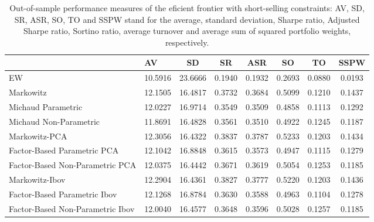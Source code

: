 \begin{table}

\caption{\label{tab:empirical_ef_2}Out-of-sample performance measures of the eficient frontier with short-selling constraints: AV, SD, SR, ASR, SO, TO and SSPW stand for the average, standard deviation, Sharpe ratio, Adjusted Sharpe ratio, Sortino ratio, average turnover and average sum of squared portfolio weights, respectively.}
\centering
\begin{tabular}[t]{l|l|c|c|c|c|c|c}
\hline
  & AV & SD & SR & ASR & SO & TO & SSPW\\
\hline
EW & 10.5916 & 23.6666 & 0.1940 & 0.1932 & 0.2693 & 0.0880 & 0.0193\\
\hline
Markowitz & 12.1505 & 16.4817 & 0.3732 & 0.3684 & 0.5099 & 0.1210 & 0.1437\\
\hline
Michaud Parametric & 12.0227 & 16.9714 & 0.3549 & 0.3509 & 0.4858 & 0.1113 & 0.1292\\
\hline
Michaud Non-Parametric & 11.8691 & 16.4828 & 0.3561 & 0.3510 & 0.4922 & 0.1245 & 0.1187\\
\hline
Markowitz-PCA & 12.3056 & 16.4322 & 0.3837 & 0.3787 & 0.5233 & 0.1203 & 0.1434\\
\hline
Factor-Based Parametric PCA & 12.1042 & 16.8848 & 0.3615 & 0.3573 & 0.4947 & 0.1115 & 0.1279\\
\hline
Factor-Based Non-Parametric PCA & 12.0375 & 16.4442 & 0.3671 & 0.3619 & 0.5054 & 0.1253 & 0.1185\\
\hline
Markowitz-Ibov & 12.2904 & 16.4361 & 0.3827 & 0.3777 & 0.5220 & 0.1203 & 0.1436\\
\hline
Factor-Based Parametric Ibov & 12.1268 & 16.8784 & 0.3630 & 0.3588 & 0.4963 & 0.1104 & 0.1278\\
\hline
Factor-Based Non-Parametric Ibov & 12.0040 & 16.4577 & 0.3648 & 0.3596 & 0.5028 & 0.1257 & 0.1185\\
\hline
\end{tabular}
\end{table}
